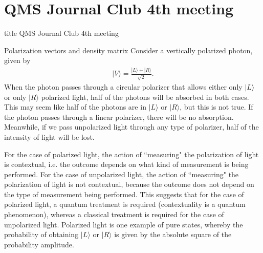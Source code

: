 \documentclass{beamer}
\begin{document}
\section{QMS Journal Club 4th meeting}
\begin{frame}
\vfill
\centering
\begin{beamercolorbox}[sep=8pt,center,shadow=true,rounded=true]{title}
\Large QMS Journal Club 4th meeting
\end{beamercolorbox}
\vfill
\end{frame}

\begin{frame}{Polarization vectors and density matrix}
\justify
Consider a vertically polarized photon, given by
\begin{align}
|V\rangle = \frac{|L\rangle + |R\rangle}{\sqrt{2}}.
\end{align}
\vfill
When the photon passes through a circular polarizer that allows either only $|L\rangle$ or only $|R\rangle$ polarized light, half of the photons will be absorbed in both cases.
\vfill
This may seem like half of the photons are in $|L\rangle$ or $|R\rangle$, but this is not true.
\vfill
If the photon passes through a linear polarizer, there will be no absorption.
\vfill
Meanwhile, if we pass unpolarized light through any type of polarizer, half of the intensity of light will be lost.
\end{frame}

\begin{frame}
\justify
For the case of polarized light, the action of ``measuring" the polarization of light is contextual, i.e. the outcome depends on what kind of measurement is being performed.
\vfill
For the case of unpolarized light, the action of ``measuring" the polarization of light is not contextual, because the outcome does not depend on the type of measurement being performed.
\vfill
This suggests that for the case of polarized light, a quantum treatment is required (contextuality is a quantum phenomenon), whereas a classical treatment is required for the case of unpolarized light.
\vfill
Polarized light is one example of pure states, whereby the probability of obtaining $|L\rangle$ or $|R\rangle$ is given by the absolute square of the probability amplitude.
\end{frame}
\end{document}
